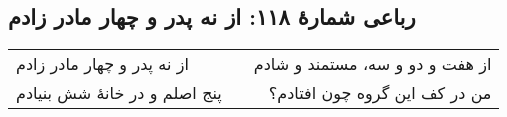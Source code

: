 \begin{center}
\section*{رباعی شمارهٔ ۱۱۸: از نه پدر و چهار مادر زادم}
\label{sec:118}
\begin{longtable}{l p{0.5cm} r}
از نه پدر و چهار مادر زادم
&&
از هفت و دو و سه، مستمند و شادم
\\
پنج اصلم و در خانهٔ شش بنیادم
&&
من در کف این گروه چون افتادم؟
\\
\end{longtable}
\end{center}
